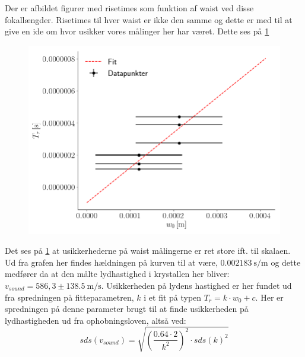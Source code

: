 \documentclass[main]{subfiles}
\begin{document}
Der er afbildet figurer med risetimes som funktion af waist ved disse fokallængder. Risetimes til hver waist er ikke den samme og dette er med til at give en ide om hvor usikker vores målinger her har været. Dette ses på \cref{fig:risetime_fig}
\begin{figure}[H]
  \includegraphics[width=\linewidth]{tegninger/risetime_fig.png}
  \caption{}
  \label{fig:risetime_fig}
\end{figure}
Det ses på \cref{fig:risetime_fig} at usikkerhederne på waist målingerne er ret store ift. til skalaen. Ud fra grafen her findes hældningen på kurven til at være, $\SI{0,002183}{\second\per\meter}$ og dette medfører da at den målte lydhastighed i krystallen her bliver: $v_{sound} = 586,3 \pm 138.5 \ \si{\meter\per\second}$. Usikkerheden på lydens hastighed er her fundet ud fra spredningen på fitteparametren, $k$ i et fit på typen $T_r = k\cdot w_0 +c $. Her er spredningen på denne parameter brugt til at finde usikkerheden på lydhastigheden ud fra ophobningsloven, altså ved:
\begin{equation}
  \nonumber sds(v_{sound}) = \sqrt{\left(\frac{0.64 \cdot 2}{k^2}\right)^2 \cdot sds(k)^2}
\end{equation}
\end{document}

